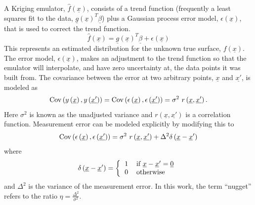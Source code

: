 \documentclass{article}
\begin{document}
A Kriging emulator, 
$\hat{f}\left(\underline{x}\right)$, consists of a trend function 
(frequently a least squares fit to the data,
$\underline{g}\left(\underline{x}\right)^T\underline{\beta}$) plus a 
Gaussian process error model, $\epsilon\left(\underline{x}\right)$, 
that is used to correct the trend function.
\begin{displaymath}
\hat{f}\left(\underline{x}\right)=\underline{g}\left(\underline{x}\right)^T\underline{\beta}+\epsilon\left(\underline{x}\right)
\end{displaymath}
This represents an estimated distribution for the unknown true surface,
$f\left(\underline{x}\right)$.  The error model, 
$\epsilon\left(\underline{x}\right)$, makes an adjustment to the
trend function so that the emulator will interpolate, and have zero
uncertainty at, the data points it was built from.   The covariance 
between the error at two arbitrary points, $\underline{x}$
and $\underline{x'}$, is modeled as 
\begin{displaymath}
{\rm Cov}\left(y\left(\underline{x}\right),y\left(\underline{x'}\right)\right)={\rm Cov}\left(\epsilon\left(\underline{x}\right),\epsilon\left(\underline{x'}\right)\right)=\sigma^2\ r\left(\underline{x},\underline{x'}\right).
\end{displaymath}
Here $\sigma^2$ is known as the unadjusted variance and 
$r\left(\underline{x},\underline{x'}\right)$ is a correlation function. 
Measurement error can be modeled explicitly by modifying this to
\begin{displaymath}
{\rm Cov}\left(\epsilon\left(\underline{x}\right),\epsilon\left(\underline{x'}\right)\right)=\sigma^2\ r\left(\underline{x},\underline{x'}\right)+\Delta^2\delta\left(\underline{x}-\underline{x}'\right)
\end{displaymath}
where 
\begin{displaymath}
\delta\left(\underline{x}-\underline{x}'\right)=\left\{\begin{tabular}{ll} 1 & if $\underline{x}-\underline{x}'=\underline{0}$ \\ 0 & otherwise \end{tabular} \right.
\end{displaymath}
and $\Delta^2$ is the variance of the measurement error.  In this work, 
the term ``nugget'' refers to the ratio 
$\eta=\frac{\Delta^2}{\sigma^2}$.\newline
\end{document}

